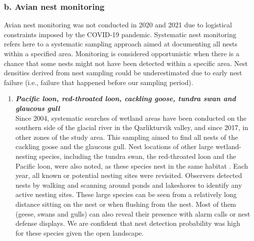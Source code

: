\documentclass[a4paper,twoside,12pt]{article}
\begin{document}
                \subsubsection*{b. Avian nest monitoring}
Avian nest monitoring was not conducted in 2020 and 2021 due to logistical constraints imposed by the COVID-19 pandemic. Systematic nest monitoring refers here to a systematic sampling approach aimed at documenting all nests within a specified area. Monitoring is considered opportunistic when there is a chance that some nests might not have been detected within a specific area. Nest densities derived from nest sampling could be underestimated due to early nest failure (i.e., failure that happened before our sampling period).

        \begin{enumerate}[label=\roman*]
        \item[] \textit{\textbf{Pacific loon, red-throated loon, cackling goose, tundra swan and glaucous gull}}\\
        Since 2004, systematic searches of wetland areas have been conducted on the southern side of the glacial river in the Qarlikturvik valley, and since 2017, in other zones of the study area. This sampling aimed to find all nests of the cackling goose and the glaucous gull. Nest locations of other large wetland-nesting species, including the tundra swan, the red-throated loon and the Pacific loon, were also noted, as these species nest in the same habitat \citep{duchesne2021,gauthier2024a}. Each year, all known or potential nesting sites were revisited. Observers detected nests by walking and scanning around ponds and lakeshores to identify any active nesting sites. These large species can be seen from a relatively long distance sitting on the nest or when flushing from the nest. Most of them (geese, swans and gulls) can also reveal their presence with alarm calls or nest defense displays. We are confident that nest detection probability was high for these species given the open landscape.
        

\end{enumerate}
\end{document}
